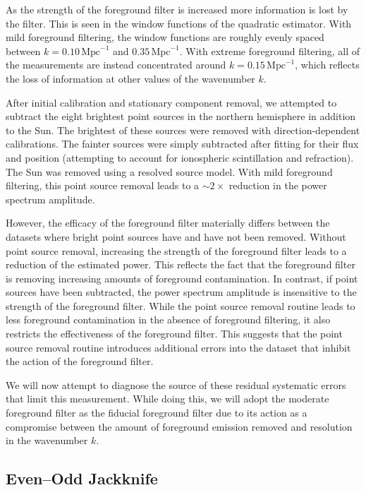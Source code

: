 \begin{bibunit}
As the strength of the foreground filter is increased more information is lost by the filter. This
is seen in the window functions of the quadratic estimator. With mild foreground filtering, the
window functions are roughly evenly spaced between $k=0.10\,\text{Mpc}^{-1}$ and
$0.35\,\text{Mpc}^{-1}$. With extreme foreground filtering, all of the measurements are instead
concentrated around $k=0.15\,\text{Mpc}^{-1}$, which reflects the loss of information at other
values of the wavenumber $k$.

After initial calibration and stationary component removal, we attempted to subtract the eight
brightest point sources in the northern hemisphere in addition to the Sun. The brightest of these
sources were removed with direction-dependent calibrations. The fainter sources were simply
subtracted after fitting for their flux and position (attempting to account for ionospheric
scintillation and refraction). The Sun was removed using a resolved source model. With mild
foreground filtering, this point source removal leads to a $\sim2\times$ reduction in the power
spectrum amplitude.

However, the efficacy of the foreground filter materially differs between the datasets where bright
point sources have and have not been removed. Without point source removal, increasing the strength
of the foreground filter leads to a reduction of the estimated power. This reflects the fact that
the foreground filter is removing increasing amounts of foreground contamination. In contrast, if
point sources have been subtracted, the power spectrum amplitude is insensitive to the strength of
the foreground filter. While the point source removal routine leads to less foreground contamination
in the absence of foreground filtering, it also restricts the effectiveness of the foreground
filter. This suggests that the point source removal routine introduces additional errors into the
dataset that inhibit the action of the foreground filter.

We will now attempt to diagnose the source of these residual systematic errors that limit this
measurement. While doing this, we will adopt the moderate foreground filter as the fiducial
foreground filter due to its action as a compromise between the amount of foreground emission
removed and resolution in the wavenumber $k$.

\subsection{Even--Odd Jackknife}


\end{bibunit}
